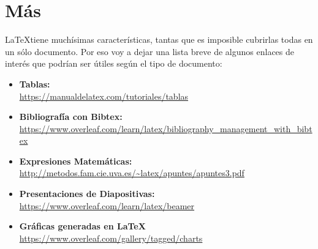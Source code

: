 \documentclass[10pt]{report}
\begin{document}
\section{Más}
\LaTeX tiene muchísimas características, tantas que es imposible cubrirlas todas en un sólo documento. Por eso voy a dejar una lista breve de algunos enlaces de interés que podrían ser útiles según el tipo de documento:

\begin{itemize}
    \item \textbf{Tablas:} \\
    \url{https://manualdelatex.com/tutoriales/tablas}
    
    \item \textbf{Bibliografía con Bibtex:}\\
    \url{https://www.overleaf.com/learn/latex/bibliography_management_with_bibtex}
    
    \item \textbf{Expresiones Matemáticas:}\\
    \url{http://metodos.fam.cie.uva.es/~latex/apuntes/apuntes3.pdf}
    
    \item \textbf{Presentaciones de Diapositivas:}\\
    \url{https://www.overleaf.com/learn/latex/beamer}
    
    \item \textbf{Gráficas generadas en \LaTeX}\\
    \url{https://www.overleaf.com/gallery/tagged/charts}    
\end{itemize}



%

\end{document}
